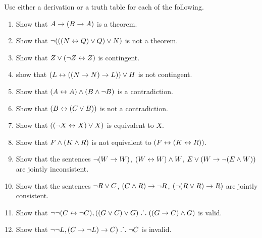 \noindent\problempart Use either a derivation or a truth table for each of the following. 
\begin{enumerate}%
\item Show that $A \rightarrow (B \rightarrow A)$ is a theorem.
\item Show that $\neg (((N \leftrightarrow Q) \vee Q) \vee N)$ is not a theorem.
\item Show that $ Z \vee (\neg Z \leftrightarrow Z) $ is contingent.
\item show that $ (L \leftrightarrow ((N \rightarrow N) \rightarrow L)) \vee H $ is not contingent.
\item Show that $ (A \leftrightarrow A) \wedge (B \wedge \neg B)$ is a contradiction.
\item Show that $ (B \leftrightarrow (C \vee B)) $ is not a contradiction.
\item Show that $ ((\neg X \leftrightarrow X) \vee X) $ is equivalent to $X$.
\item Show that $F \wedge (K \wedge R) $ is not equivalent to $ (F \leftrightarrow (K \leftrightarrow R))$.
\item Show that the sentences $ \neg (W \rightarrow W)$, $(W \leftrightarrow W) \wedge W$, $E \vee (W \rightarrow \neg (E \wedge W))$ are jointly inconsistent.
\item Show that the sentences  $\neg R \vee C $, $(C \wedge R) \rightarrow \neg R$, $(\neg (R \vee R) \rightarrow R) $ are jointly consistent.
\item Show that $\neg \neg (C \leftrightarrow \neg C), ((G \vee C) \vee G) \mathrel{\ldotp\dot{}\,\ldotp} ((G \rightarrow C) \wedge G) $ is valid.
\item Show that $ \neg \neg L,  (C \rightarrow \neg L) \rightarrow C) \mathrel{\ldotp\dot{}\,\ldotp} \neg C$ is invalid. 
\end{enumerate}
